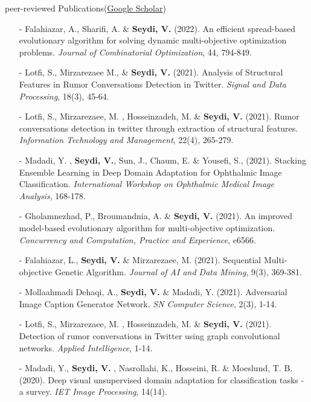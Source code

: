 \documentclass{resume} %
\begin{document}
\begin{rSection}{peer-reviewed Publications\small{(\href{https://scholar.google.com/citations?hl=en&user=L2z7NuwAAAAJ&view_op=list_works}{Google Scholar})}}
\begin{itemize}
\item[-] Falahiazar, A., Sharifi, A. \faEnvelopeO \hspace{1ex}  \& \textbf{Seydi, V.} (2022). An efficient spread-based evolutionary algorithm for solving dynamic multi-objective optimization problems. \textit{Journal of Combinatorial Optimization}, 44, 794-849.
\item[-] Lotfi, S., Mirzarezaee M., \& \textbf{Seydi, V.} (2021). Analysis of Structural Features in Rumor Conversations Detection in Twitter. \textit{Signal and Data Processing}, 18(3), 45-64.
\item[-] Lotfi, S., Mirzarezaee, M. \faEnvelopeO \hspace{1ex} , Hosseinzadeh, M. \& \textbf{Seydi, V.} (2021). Rumor conversations detection in twitter through extraction of structural features. \textit{Information Technology and Management}, 22(4), 265-279.
\item[-] Madadi, Y. \faEnvelopeO \hspace{1ex} , \textbf{Seydi, V.}, Sun, J., Chaum, E. \& Yousefi, S., (2021). Stacking Ensemble Learning in Deep Domain Adaptation for Ophthalmic Image Classification. \textit{International Workshop on Ophthalmic Medical Image Analysis}, 168-178.
\item[-] Gholamnezhad, P., Broumandnia, A. \faEnvelopeO \hspace{1ex}  \& \textbf{Seydi, V.} (2021). An improved model-based evolutionary algorithm for multi-objective optimization. \textit{Concurrency and Computation, Practice and Experience}, e6566.
\item[-] Falahiazar, L., \textbf{Seydi, V.} \faEnvelopeO \hspace{1ex}  \& Mirzarezaee, M. (2021). Sequential Multi-objective Genetic Algorithm. \textit{Journal of AI and Data Mining}, 9(3), 369-381.
\item[-] Mollaahmadi Dehaqi, A., \textbf{Seydi, V.} \faEnvelopeO \hspace{1ex}  \& Madadi, Y. (2021). Adversarial Image Caption Generator Network. \textit{SN Computer Science}, 2(3), 1-14.
\item[-] Lotfi, S., Mirzarezaee, M. \faEnvelopeO \hspace{1ex} , Hosseinzadeh, M. \& \textbf{Seydi, V.} (2021). Detection of rumor conversations in Twitter using graph convolutional networks. \textit{Applied Intelligence}, 1-14.
\item[-] Madadi, Y., \textbf{Seydi, V.} \faEnvelopeO \hspace{1ex} , Nasrollahi, K., Hosseini, R. \& Moeslund, T. B. (2020). Deep visual unsupervised domain adaptation for classification tasks - a survey. \textit{IET Image Processing}, 14(14).

\end{itemize}
\end{rSection}
\end{document}
